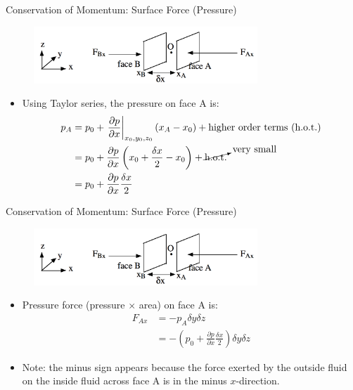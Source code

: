 \begin{frame}{Conservation of Momentum: Surface Force (Pressure)}
\begin{figure}
		\includegraphics[width=0.75\textwidth]{pressure2.png}	
	\end{figure}
\begin{itemize}
	\item Using Taylor series, the pressure on face A is:
	\begin{align*}
	p_A &= p_0 + \left.\frac{\partial p}{\partial x}\right|_{x_0,y_0,z_0}(x_A - x_0) + \text{higher order terms (h.o.t.)}\\
	&= p_0 + \frac{\partial p}{\partial x} \left(x_0 + \frac{\delta x}{2} - x_0 \right)+ \cancelto{\text{very small}}{\text{h.o.t.}}\\
	&= p_0 + \frac{\partial p}{\partial x}\frac{\delta x}{2}
	\end{align*}
\end{itemize}
\end{frame}
\begin{frame}{Conservation of Momentum: Surface Force (Pressure)}
\begin{figure}
		\includegraphics[width=0.75\textwidth]{pressure2.png}	
	\end{figure}
\begin{itemize}
	\item Pressure force (pressure $\times$ area) on face A is:
	\begin{align*}
	 	F_{Ax} &= -p_A \delta y \delta z\\
	 	&= -\left(p_0 + \frac{\partial p}{\partial x}\frac{\delta x}{2}\right)\delta y \delta z
	\end{align*}
	\item Note: the minus sign appears because the force exerted by the outside fluid on the inside fluid across face A is in the minus $x$-direction.
\end{itemize}
\end{frame}
